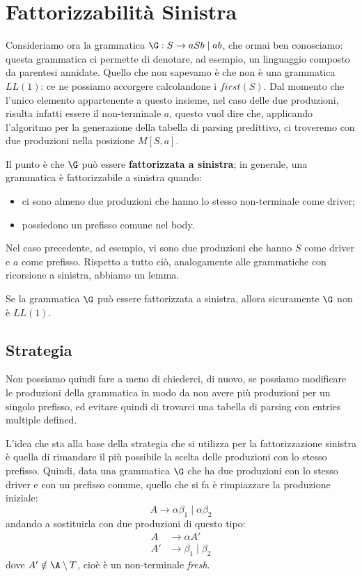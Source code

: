 \documentclass[class=book, crop=false, oneside, 12pt]{standalone}
\begin{document}
\section{Fattorizzabilità Sinistra}
Consideriamo ora la grammatica \(\G: S \rightarrow aSb \mid ab\), che ormai ben conosciamo: questa grammatica ci permette di denotare, ad esempio, un linguaggio composto da parentesi annidate. Quello che non sapevamo è che non è una grammatica \(LL(1)\): ce ne possiamo accorgere calcolandone i \(first(S)\). Dal momento che l'unico elemento appartenente a questo insieme, nel caso delle due produzioni, risulta infatti essere il non-terminale \(a\), questo vuol dire che, applicando l'algoritmo per la generazione della tabella di parsing predittivo, ci troveremo con due produzioni nella posizione \(M[S, a]\).

Il punto è che \(\G\) può essere \textbf{fattorizzata a sinistra}; in generale, una grammatica è fattorizzabile a sinistra quando:
\begin{itemize}
    \item ci sono almeno due produzioni che hanno lo stesso non-terminale come driver;
    \item possiedono un prefisso comune nel body.
\end{itemize}
Nel caso precedente, ad esempio, vi sono due produzioni che hanno \(S\) come driver e \(a\) come prefisso. Rispetto a tutto ciò, analogamente alle grammatiche con ricorsione a sinistra, abbiamo un lemma.

\begin{lemma}
    Se la grammatica \(\G\) può essere fattorizzata a sinistra, allora sicuramente \(\G\) non è \(LL(1)\).    
\end{lemma}

\subsection{Strategia}
Non possiamo quindi fare a meno di chiederci, di nuovo, se possiamo modificare le produzioni della grammatica in modo da non avere più produzioni per un singolo prefisso, ed evitare quindi di trovarci una tabella di parsing con entries multiple defined.

L'idea che sta alla base della strategia che si utilizza per la fattorizzazione sinistra è quella di rimandare il più possibile la scelta delle produzioni con lo stesso prefisso. Quindi, data una grammatica \(\G\) che ha due produzioni con lo stesso driver e con un prefisso comune, quello che si fa è rimpiazzare la produzione iniziale:
\begin{equation*}
    A \rightarrow \alpha \beta_1 \mid \alpha \beta_2  
\end{equation*}
andando a sostituirla con due produzioni di questo tipo:
\begin{align*}
    A &\rightarrow \alpha A' \\
    A' &\rightarrow \beta_1 \mid \beta_2        
\end{align*}
dove \(A' \notin \A \setminus T\), cioè è un non-terminale \emph{fresh}.
\end{document}
